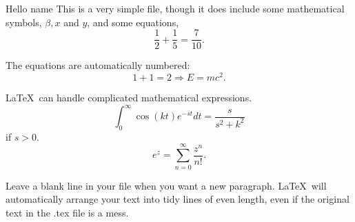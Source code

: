 \documentclass[12pt]{article}
\begin{document}
  Hello {{ name }}
  This is a very simple file, though it does include some mathematical 
  symbols, $\beta, x$ and $y$,  and some equations,  
 \begin{equation} 
 \frac{1}{2} + \frac{1}{5} =  \frac{7}{10}. 
  \end{equation} 
 
 The equations are automatically numbered:
\begin{equation} 
 1 + 1 = 2 \Rightarrow E = m c^2.  
\end{equation}  

  \LaTeX\ can handle complicated mathematical expressions. 
 \begin{equation} 
 \int_0^\infty \cos (k t) e^{-s t} d t = \frac{s}{s^2 + k^2}
 \end{equation} 
 if $s > 0$. 
 \begin{equation}
 e^z = \sum_{n=0}^\infty \frac{ z^n}{n!} . 
 \end{equation} 

 Leave a blank line in your file when you want a new paragraph. 
      \LaTeX\ will automatically 
 arrange your text
              into tidy lines of 
 even length, even 
 if the 
 original text in the .tex file is a mess. 
 
 
\end{document}
